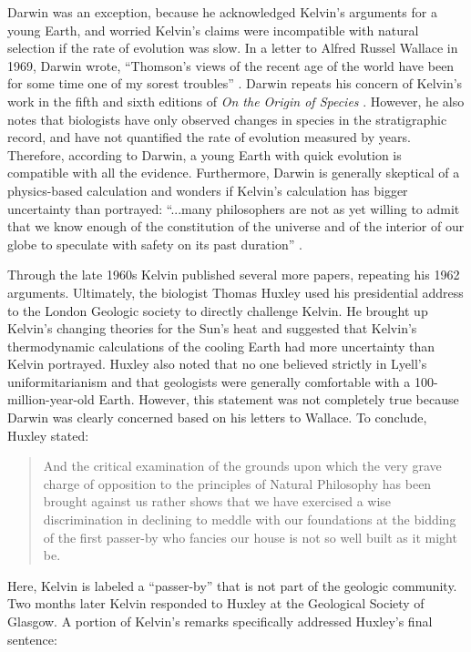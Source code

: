 \documentclass[12pt]{article}
\begin{document}
Darwin was an exception, because he acknowledged Kelvin's arguments for a young Earth, and worried Kelvin's claims were incompatible with natural selection if the rate of evolution was slow. In a letter to Alfred Russel Wallace in 1969, Darwin wrote, ``Thomson's views of the recent age of the world have been for some time one of my sorest troubles'' \citep{Marchant_1916}. Darwin repeats his concern of Kelvin's work in the fifth and sixth editions of \emph{On the Origin of Species} \citep{Darwin_1869,Darwin_1872}. However, he also notes that biologists have only observed changes in species in the stratigraphic record, and have not quantified the rate of evolution measured by years. Therefore, according to Darwin, a young Earth with quick evolution is compatible with all the evidence. Furthermore, Darwin is generally skeptical of a physics-based calculation and wonders if Kelvin's calculation has bigger uncertainty than portrayed: ``...many philosophers are not as yet willing to admit that we know enough of the constitution of the universe and of the interior of our globe to speculate with safety on its past duration'' \citep{Darwin_1872}.

Through the late 1960s Kelvin published several more papers, repeating his 1962 arguments. Ultimately, the biologist Thomas Huxley used his presidential address to the London Geologic society to directly challenge Kelvin. He brought up Kelvin's changing theories for the Sun's heat and suggested that Kelvin's thermodynamic calculations of the cooling Earth had more uncertainty than Kelvin portrayed. Huxley also noted that no one believed strictly in Lyell's uniformitarianism and that geologists were generally comfortable with a 100-million-year-old Earth. However, this statement was not completely true because Darwin was clearly concerned based on his letters to Wallace. To conclude, Huxley stated: 

\begin{quote}
  And the critical examination of the grounds upon which the very grave charge of opposition to the principles of Natural Philosophy has been brought against us rather shows that we have exercised a wise discrimination in declining to meddle with our foundations at the bidding of the first passer-by who fancies our house is not so well built as it might be.
\end{quote}
Here, Kelvin is labeled a ``passer-by'' that is not part of the geologic community. Two months later Kelvin responded to Huxley at the Geological Society of Glasgow. A portion of Kelvin's remarks specifically addressed Huxley's final sentence:
\end{document}
